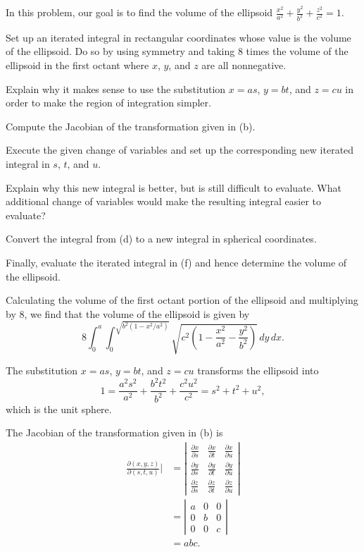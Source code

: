 \begin{exercises}
	\item In this problem, our goal is to find the volume of the ellipsoid $\frac{x^2}{a^2} + \frac{y^2}{b^2} + \frac{z^2}{c^2} = 1$.  
	\ba
		\item Set up an iterated integral in rectangular coordinates whose value is the volume of the ellipsoid.  Do so by using symmetry and taking 8 times the volume of the ellipsoid in the first octant where $x$, $y$, and $z$ are all nonnegative.
		\item Explain why it makes sense to use the substitution $x = as$, $y = bt$, and $z = cu$ in order to make the region of integration simpler.
		\item Compute the Jacobian of the transformation given in (b).
		\item Execute the given change of variables and set up the corresponding new iterated integral in $s$, $t$, and $u$.
		\item Explain why this new integral is better, but is still difficult to evaluate.  What additional change of variables would make the resulting integral easier to evaluate?
		\item Convert the integral from (d) to a new integral in spherical coordinates.
		\item Finally, evaluate the iterated integral in (f) and hence determine the volume of the ellipsoid.
	\ea
	
\begin{exerciseSolution}
	\ba
		\item Calculating the volume of the first octant portion of the ellipsoid and multiplying by 8, we find that the volume of the ellipsoid is given by 
\[8\int_{0}^{a} \int_{0}^{\sqrt{b^2(1-x^2/a^2)}} \sqrt{c^2\left(1-\frac{x^2}{a^2}-\frac{y^2}{b^2}\right)}  \, dy \, dx.\]
		\item The substitution $x = as$, $y = bt$, and $z = cu$ transforms the ellipsoid into 
\[1 = \frac{a^2s^2}{a^2} + \frac{b^2t^2}{b^2} + \frac{c^2u^2}{c^2} = s^2+t^2+u^2,\]
which is the unit sphere. 
		\item The Jacobian of the transformation given in (b) is
\begin{align*}
\frac{\partial (x,y,z)}{\partial (s,t,u)}| &= \left| \begin{array}{ccc} \frac{\partial x}{\partial s} & \frac{\partial x}{\partial t} & \frac{\partial x}{\partial u} \\ \frac{\partial y}{\partial s} & \frac{\partial y}{\partial t} & \frac{\partial y}{\partial u} \\ \frac{\partial z}{\partial s} & \frac{\partial z}{\partial t} & \frac{\partial z}{\partial u} \end{array} \right| \\
	&= \left| \begin{array}{ccc} a & 0 & 0 \\ 0 & b & 0 \\ 0 & 0 & c \end{array} \right| \\
	&= abc.
\end{align*}


\end{exerciseSolution}
\end{exercises}
